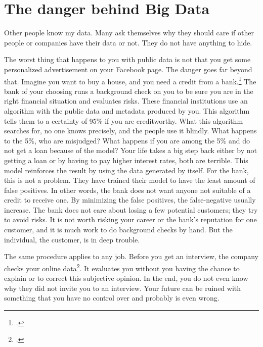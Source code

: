 \documentclass[paper=a4, fontsize=11pt]{article}
\begin{document}
\section{The danger behind Big Data}
Other people know my data. Many ask themselves why they should care if other people or companies have their data or not. They do not have anything to hide.

The worst thing that happens to you with public data is not that you get some personalized advertisement on your Facebook page. The danger goes far beyond that. Imagine you want to buy a house, and you need a credit from a bank.\footcite{bankscheck} The bank of your choosing runs a background check on you to be sure you are in the right financial situation and evaluates risks. These financial institutions use an algorithm with the public data and metadata produced by you. This algorithm tells them to a certainty of 95\% if you are creditworthy. What this algorithm searches for, no one knows precisely, and the people use it blindly. What happens to the 5\%, who are misjudged? What happens if you are among the 5\% and do not get a loan because of the model? Your life takes a big step back either by not getting a loan or by having to pay higher interest rates, both are terrible. This model reinforces the result by using the data generated by itself. For the bank, this is not a problem. They have trained their model to have the least amount of false positives. In other words, the bank does not want anyone not suitable of a credit to receive one. By minimizing the false positives, the false-negative usually increase. The bank does not care about losing a few potential customers; they try to avoid risks. It is not worth risking your career or the bank's reputation for one customer, and it is much work to do background checks by hand. But the individual, the customer, is in deep trouble.

The same procedure applies to any job. Before you get an interview, the company checks your online data\footcite{background}. It evaluates you without you having the chance to explain or to correct this subjective opinion. In the end, you do not even know why they did not invite you to an interview. Your future can be ruined with something that you have no control over and probably is even wrong.
\end{document}
